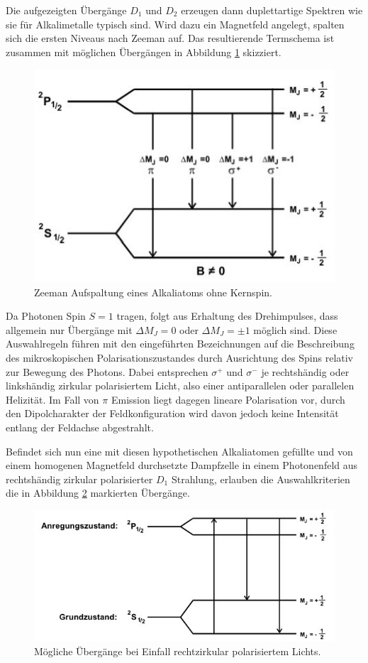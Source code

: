 Die aufgezeigten Übergänge $D_1$ und $D_2$ erzeugen dann duplettartige Spektren wie sie für Alkalimetalle typisch sind.
Wird dazu ein Magnetfeld angelegt, spalten sich die ersten Niveaus nach Zeeman auf. Das resultierende Termschema ist zusammen
mit möglichen Übergängen in Abbildung \ref{fig:zeeman} skizziert.

\begin{figure}[H]
	\centering
	\includegraphics[width=0.55\linewidth]{content/grafik/zeeman.jpg}
	\caption{Zeeman Aufspaltung eines Alkaliatoms ohne Kernspin. \cite{pumpen}}
	\label{fig:zeeman}
\end{figure}

Da Photonen Spin $S = 1$ tragen, folgt aus Erhaltung des Drehimpulses, dass allgemein nur Übergänge mit $\Delta M_J = 0$ oder
$\Delta M_J = \pm 1$ möglich sind. Diese Auswahlregeln führen mit den eingeführten Bezeichnungen auf die Beschreibung des
mikroskopischen Polarisationszustandes durch Ausrichtung des Spins relativ zur Bewegung des Photons. Dabei entsprechen $\sigma^+$
und $\sigma^-$ je rechtshändig oder linkshändig zirkular polarisiertem Licht, also einer antiparallelen oder parallelen Helizität.
Im Fall von $\pi$ Emission liegt dagegen lineare Polarisation vor, durch den Dipolcharakter der Feldkonfiguration wird
davon jedoch keine Intensität entlang der Feldachse abgestrahlt.

Befindet sich nun eine mit diesen hypothetischen Alkaliatomen gefüllte und von einem homogenen Magnetfeld durchsetzte Dampfzelle
in einem Photonenfeld aus rechtshändig zirkular polarisierter $D_1$ Strahlung, erlauben die Auswahlkriterien die in Abbildung
\ref{fig:pumpen} markierten Übergänge.

\begin{figure}[H]
	\centering
	\includegraphics[width=0.65\linewidth]{content/grafik/pumpen.jpg}
	\caption{Mögliche Übergänge bei Einfall rechtzirkular polarisiertem Lichts. \cite{pumpen}}
	\label{fig:pumpen}
\end{figure}

